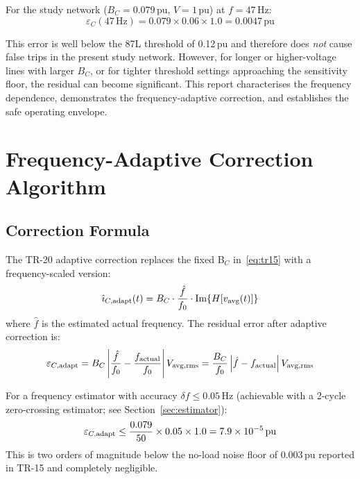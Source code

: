 \documentclass[11pt, a4paper]{article}
\begin{document}
For the study network ($B_C = 0.079$\,pu, $V = 1$\,pu) at $f=47$\,Hz:
\begin{equation}
  \varepsilon_C(47\,\text{Hz}) = 0.079 \times 0.06 \times 1.0 = 0.0047\,\text{pu}
\end{equation}

This error is well below the 87L threshold of 0.12\,pu and therefore does
\emph{not} cause false trips in the present study network.  However, for
longer or higher-voltage lines with larger $B_C$, or for tighter threshold
settings approaching the sensitivity floor, the residual can become significant.
This report characterises the frequency dependence, demonstrates the
frequency-adaptive correction, and establishes the safe operating envelope.


\section{Frequency-Adaptive Correction Algorithm}
\label{sec:algorithm}

\subsection{Correction Formula}

The TR-20 adaptive correction replaces the fixed B$_C$ in~\eqref{eq:tr15}
with a frequency-scaled version:
\begin{equation}
  \hat{\imath}_{C,\rm adapt}(t)
    = B_C \cdot \frac{\hat{f}}{f_0}
      \cdot \mathrm{Im}\!\left\{H[v_{\rm avg}(t)]\right\}
  \label{eq:adaptive}
\end{equation}
where $\hat{f}$ is the estimated actual frequency.  The residual error after
adaptive correction is:
\begin{equation}
  \varepsilon_{C,\rm adapt}
    = B_C \left|\frac{\hat{f}}{f_0} - \frac{f_{\rm actual}}{f_0}\right|
      V_{\rm avg,rms}
    = \frac{B_C}{f_0} \left|\hat{f} - f_{\rm actual}\right| V_{\rm avg,rms}
  \label{eq:adapt_error}
\end{equation}

For a frequency estimator with accuracy $\delta f \leq 0.05$\,Hz (achievable
with a 2-cycle zero-crossing estimator; see Section~\ref{sec:estimator}):
\begin{equation}
  \varepsilon_{C,\rm adapt}
    \leq \frac{0.079}{50} \times 0.05 \times 1.0
    = 7.9 \times 10^{-5}\,\text{pu}
\end{equation}
This is two orders of magnitude below the no-load noise floor of 0.003\,pu
reported in TR-15 and completely negligible.
\end{document}
